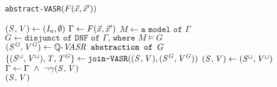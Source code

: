 
	\begin{algorithm}
		\caption{\texttt{abstract-VASR$(F(\vec{x}, \vec{x}'))$}}\label{euclid}
		\begin{algorithmic}[1]
			\State $\mathit{(S^{}, V^{})} \gets (\mathit{I_n}, \emptyset)$
			\State $\Gamma \gets F(\vec{x}, \vec{x}')$
			\State $M \gets \texttt{a model of } \Gamma$
			\State $G \gets \texttt{disjunct of DNF of } \Gamma \texttt{, where } M \models G$
			\State $\mathit{(S^{G}, V^{G})} \gets \mathit{\mathbb{Q} \text{-}VASR} \texttt{ abstraction of }G$
			\State $\{\mathit{(S^{\sqcup}, V^{\sqcup})}, \mathit{T, T^G} \} \gets \texttt{join-VASR}(\mathit{(S^{}, V^{})}, \mathit{(S^{G}, V^{G})})$
			\State $\mathit{(S^{}, V^{})} \gets \mathit{(S^{\sqcup}, V^{\sqcup})}$
			\State $\Gamma \gets \Gamma\ \land\ \neg\gamma\abst{}$
			\EndWhile \\
			\Return $\mathit{(S^{}, V^{})}$
		\end{algorithmic}
	\end{algorithm}
